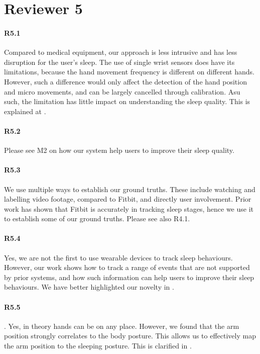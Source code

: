 \section*{Reviewer 5}

\paragraph{R5.1} Compared to medical equipment, our approach is less intrusive and has less disruption for the user's sleep. The use of
single wrist sensors does have its limitations, because the hand movement frequency is different on different hands. However, such a
difference would only affect the detection of the hand position and micro movements, and can be largely cancelled through calibration. Asu
such, the limitation has little impact on understanding the sleep quality. This is explained at .


\paragraph{R5.2} Please see M2 on how our system help users to improve their sleep quality.

\paragraph{R5.3} We use multiple ways to establish our ground truths. These include watching and labelling video footage, compared to
Fitbit, and directly user involvement. Prior work has shown that Fitbit is accurately in tracking sleep stages, hence we use it to
establish some of our ground truths. Please see also R4.1.

\paragraph{R5.4} Yes, we are not the first to use wearable devices to track sleep behaviours. However, our work shows how
 to track a range of events that are not supported by prior systems, and how such information can help users to improve
their sleep behaviours. We have better highlighted our novelty in .

\paragraph{R5.5}. Yes, in theory hands can be on any place. However, we found that the arm position strongly correlates to the body
posture. This allows us to effectively map the arm position to the sleeping posture. This is clarified in .

